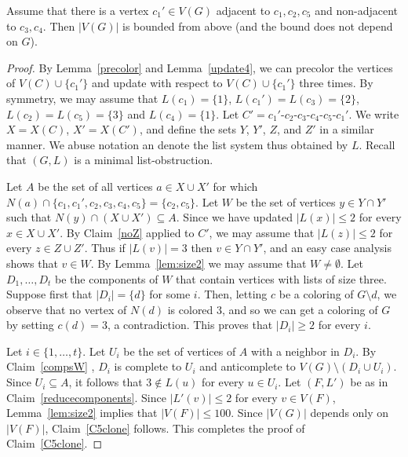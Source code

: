 \documentclass[11pt]{article}
\begin{document}
\begin{claim}\label{C5clone}
Assume that there is a vertex $c_1' \in V(G)$ adjacent to $c_1,c_2,c_5$ and non-adjacent to $c_3,c_4$.   Then $|V(G)|$ is bounded from above 
(and the bound does not depend on $G$).

\end{claim}
\begin{proof}
By Lemma~\ref{precolor} and Lemma~\ref{update4}, we can precolor the vertices 
of $V(C) \cup \{c_1'\}$  and update with  respect to $V(C) \cup \{c_1'\}$ 
three times.
By symmetry, we may assume that $L(c_1)=\{1\}$, $L(c_1')=L(c_3)=\{2\}$, $L(c_2)=L(c_5)=\{3\}$ and $L(c_4)=\{1\}$.
Let $C'=c_1'$-$c_2$-$c_3$-$c_4$-$c_5$-$c_1'$.
We write $X=X(C)$, $X'=X(C')$, and define the sets $Y$, $Y'$, $Z$, and $Z'$ in a similar manner. We abuse notation an denote the list system thus obtained by $L$.  Recall that $(G,L)$ is a minimal list-obstruction.


Let $A$ be the set of all vertices $a \in X \cup X'$ for which $N(a) \cap \{c_1,c_1',c_2,c_3,c_4,c_5\} = \{c_2,c_5\}$. 
Let $W$ be the set of vertices  $y \in Y \cap Y'$ such that $N(y) \cap (X \cup X') \subseteq A$. 
Since we have updated $|L(x)| \leq 2$ for every $x \in X \cup X'$.
By Claim~\ref{noZ} applied to $C'$,
we may assume that $|L(z)| \leq 2$ for every 
$z \in Z \cup Z'$.
Thus if $|L(v)|=3$ then $v \in Y \cap Y'$, and an easy case analysis shows that $v \in W$.
By Lemma~\ref{lem:size2} we may assume that $W \neq \emptyset$.
Let $D_1, \ldots ,D_t$ be the components of $W$ that contain vertices with 
lists of size three.
Suppose first that $|D_i|=\{d\}$ for some $i$.
Then, letting $c$ be a coloring of $G \setminus d$, we observe that no vertex of $N(d)$ is colored $3$, and so we can get a coloring of $G$ by setting $c(d)=3$, a contradiction. This proves that $|D_i| \geq 2$ for every $i$.

Let $i \in \{1, \ldots, t\}$. Let $U_i$ be the set of vertices of $A$ with a neighbor in $D_i$. By  Claim~\ref{compsW} , $D_i$ is complete to $U_i$
and anticomplete to $V(G) \setminus (D_i \cup U_i)$. 
Since $U_i \subseteq A$,
it follows that $3 \not \in L(u)$ for every $u \in U_i$. Let $(F,L')$ be as in 
Claim~\ref{reducecomponents}. Since $|L'(v)| \leq 2$ for every $v \in V(F)$,
Lemma~\ref{lem:size2} implies that $|V(F)| \leq 100$. Since
$|V(G)|$ depends only on $|V(F)|$, Claim~\ref{C5clone} follows.
This completes the proof of Claim~\ref{C5clone}.
\end{proof}
\end{document}
